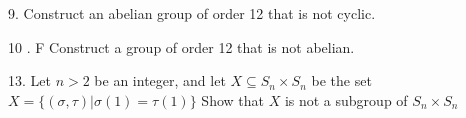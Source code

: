 \begin{mdframed}[style=darkQuesion]
  9. Construct an abelian group of order 12 that is not cyclic.
\end{mdframed}
\begin{mdframed}[style=darkAnswer,frametitle={Joe Starr}]
  
\end{mdframed}
\newpage
\begin{mdframed}[style=darkQuesion]
  10 . F Construct a group of order 12 that is not abelian.
\end{mdframed}
\begin{mdframed}[style=darkAnswer,frametitle={Joe Starr}]
  
\end{mdframed}
\newpage
\begin{mdframed}[style=darkQuesion]
  13. Let $n>2$ be an integer, and let $X \subseteq S_{n} \times S_{n}$ be the set $X=\{(\sigma, \tau) | \sigma(1)=\tau(1)\}$ Show that $X$ is not a subgroup of $S_{n} \times S_{n}$
\end{mdframed}
\begin{mdframed}[style=darkAnswer,frametitle={Joe Starr}]
  
\end{mdframed}
\newpage
